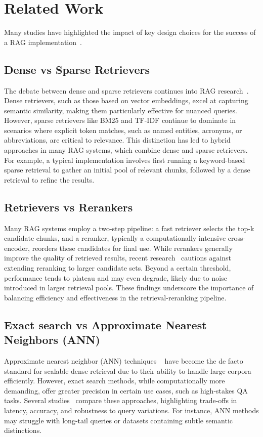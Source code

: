 \section{Related Work}
Many studies have
highlighted the impact of key design choices for the success of a RAG implementation~\cite{ragimp1,ragimp2, ragimp3}. 

\subsection{Dense vs Sparse Retrievers}
The debate between dense and sparse retrievers continues into
RAG
research~\cite{sparse-vs-dense1,sparse-vs-dense2}. Dense retrievers, such as those based on vector embeddings, excel at capturing semantic similarity, making them particularly effective for nuanced queries. However, sparse retrievers like BM25 and TF-IDF continue to dominate in scenarios where explicit token matches, such as named entities, acronyms, or abbreviations, are critical to relevance. This distinction has led to hybrid approaches in many RAG systems, which combine dense and sparse retrievers. For example, a typical implementation involves first running a keyword-based sparse retrieval to gather an initial pool of relevant chunks, followed by a dense retrieval to refine the results. 

\subsection{Retrievers vs Rerankers}
Many RAG systems employ a two-step pipeline: a fast retriever selects the top-k candidate chunks, and a reranker, typically a computationally intensive cross-encoder, reorders these candidates for final use. While rerankers generally improve the quality of retrieved results, recent research~\cite{Jacob-Drozdov-drowning-in-documents} cautions against extending reranking to larger candidate sets. Beyond a certain threshold, performance tends to plateau and may even degrade, likely due to noise introduced in larger retrieval pools. These findings underscore the importance of balancing efficiency and effectiveness in the retrieval-reranking pipeline.

\subsection{Exact search vs Approximate Nearest Neighbors (ANN)}
Approximate nearest neighbor (ANN) techniques ~\cite{ann-ir-paper} have become the de facto standard for scalable dense retrieval due to their ability to handle large corpora efficiently. However, exact search methods, while computationally more demanding, offer greater precision in certain use cases, such as high-stakes QA tasks. Several studies~\cite{anncomp1, anncomp2} compare these approaches, highlighting trade-offs in latency, accuracy, and robustness to query variations. For instance, ANN methods may struggle with long-tail queries or datasets containing subtle semantic distinctions.

